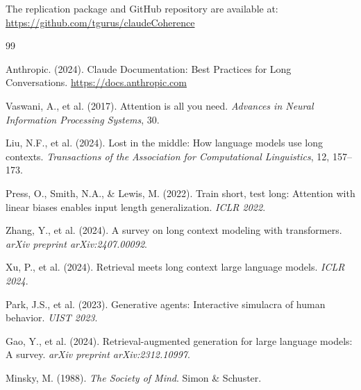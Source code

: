 \documentclass[11pt,a4paper]{article}
\begin{document}
The replication package and GitHub repository are available at: \url{https://github.com/tgurus/claudeCoherence}


\begin{thebibliography}{99}

Anthropic. (2024). Claude Documentation: Best Practices for Long Conversations. \url{https://docs.anthropic.com}

Vaswani, A., et al. (2017). Attention is all you need. \textit{Advances in Neural Information Processing Systems}, 30.

Liu, N.F., et al. (2024). Lost in the middle: How language models use long contexts. \textit{Transactions of the Association for Computational Linguistics}, 12, 157--173.

Press, O., Smith, N.A., \& Lewis, M. (2022). Train short, test long: Attention with linear biases enables input length generalization. \textit{ICLR 2022}.

Zhang, Y., et al. (2024). A survey on long context modeling with transformers. \textit{arXiv preprint arXiv:2407.00092}.

Xu, P., et al. (2024). Retrieval meets long context large language models. \textit{ICLR 2024}.

Park, J.S., et al. (2023). Generative agents: Interactive simulacra of human behavior. \textit{UIST 2023}.

Gao, Y., et al. (2024). Retrieval-augmented generation for large language models: A survey. \textit{arXiv preprint arXiv:2312.10997}.

Minsky, M. (1988). \textit{The Society of Mind}. Simon \& Schuster.

\end{thebibliography}
\end{document}
